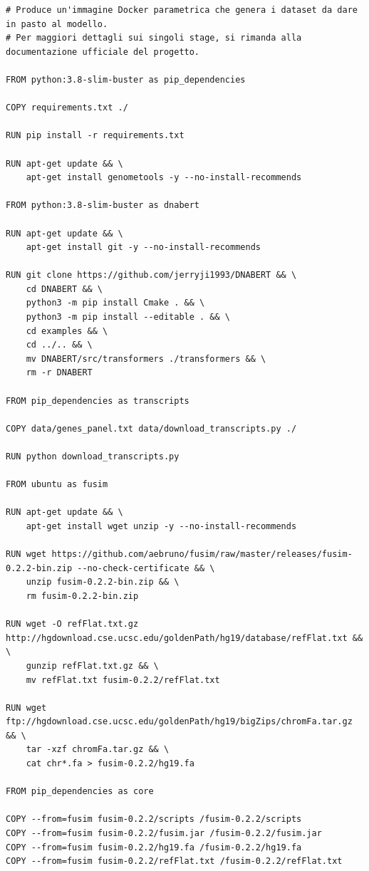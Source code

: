 \begin{code}
\label{code:apx:a:dockerfile}
\begin{verbatim}
# Produce un'immagine Docker parametrica che genera i dataset da dare in pasto al modello.
# Per maggiori dettagli sui singoli stage, si rimanda alla documentazione ufficiale del progetto.
    
FROM python:3.8-slim-buster as pip_dependencies
    
COPY requirements.txt ./
    
RUN pip install -r requirements.txt
    
RUN apt-get update && \
    apt-get install genometools -y --no-install-recommends
    
FROM python:3.8-slim-buster as dnabert
    
RUN apt-get update && \
    apt-get install git -y --no-install-recommends
    
RUN git clone https://github.com/jerryji1993/DNABERT && \
    cd DNABERT && \
    python3 -m pip install Cmake . && \
    python3 -m pip install --editable . && \
    cd examples && \
    cd ../.. && \
    mv DNABERT/src/transformers ./transformers && \
    rm -r DNABERT
    
FROM pip_dependencies as transcripts
    
COPY data/genes_panel.txt data/download_transcripts.py ./
    
RUN python download_transcripts.py
    
FROM ubuntu as fusim
    
RUN apt-get update && \
    apt-get install wget unzip -y --no-install-recommends
    
RUN wget https://github.com/aebruno/fusim/raw/master/releases/fusim-0.2.2-bin.zip --no-check-certificate && \
    unzip fusim-0.2.2-bin.zip && \
    rm fusim-0.2.2-bin.zip
    
RUN wget -O refFlat.txt.gz http://hgdownload.cse.ucsc.edu/goldenPath/hg19/database/refFlat.txt && \
    gunzip refFlat.txt.gz && \
    mv refFlat.txt fusim-0.2.2/refFlat.txt
    
RUN wget ftp://hgdownload.cse.ucsc.edu/goldenPath/hg19/bigZips/chromFa.tar.gz && \
    tar -xzf chromFa.tar.gz && \
    cat chr*.fa > fusim-0.2.2/hg19.fa
    
FROM pip_dependencies as core
    
COPY --from=fusim fusim-0.2.2/scripts /fusim-0.2.2/scripts
COPY --from=fusim fusim-0.2.2/fusim.jar /fusim-0.2.2/fusim.jar
COPY --from=fusim fusim-0.2.2/hg19.fa /fusim-0.2.2/hg19.fa
COPY --from=fusim fusim-0.2.2/refFlat.txt /fusim-0.2.2/refFlat.txt
    

\end{verbatim}
\end{code}
